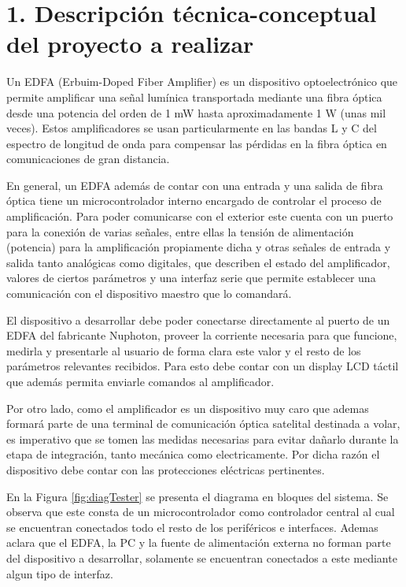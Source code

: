 \documentclass[
11pt, %
codirector, %
]{charter}
\begin{document}
\section{1. Descripción técnica-conceptual del proyecto a realizar}
\label{sec:descripcion}

Un EDFA (Erbuim-Doped Fiber Amplifier) es un dispositivo optoelectrónico que permite amplificar una señal lumínica transportada mediante una fibra óptica desde una potencia del orden de 1 mW hasta aproximadamente 1 W (unas mil veces). Estos amplificadores se usan particularmente en las bandas L y C del espectro de longitud de onda para compensar las pérdidas en la fibra óptica en comunicaciones de gran distancia.

En general, un EDFA además de contar con una entrada y una salida de fibra óptica tiene un microcontrolador interno encargado de controlar el proceso de amplificación. Para poder comunicarse con el exterior este cuenta con un puerto para la conexión de varias señales, entre ellas la tensión de alimentación (potencia) para la amplificación propiamente dicha y otras señales de entrada y salida tanto analógicas como digitales, que describen el estado del amplificador, valores de ciertos parámetros y una interfaz serie que permite establecer una comunicación con el dispositivo maestro que lo comandará.

El dispositivo a desarrollar debe poder conectarse directamente al puerto de un EDFA del fabricante Nuphoton, proveer la corriente necesaria para que funcione, medirla y presentarle al usuario de forma clara este valor y el resto de los parámetros relevantes recibidos. Para esto debe contar con un display LCD táctil que además permita enviarle comandos al amplificador.

Por otro lado, como el amplificador es un dispositivo muy caro que ademas formará parte de una terminal de comunicación óptica satelital destinada a volar, es imperativo que se tomen las medidas necesarias para evitar dañarlo durante la etapa de integración, tanto mecánica como electricamente. Por dicha razón el dispositivo debe contar con las protecciones eléctricas pertinentes.

En la Figura \ref{fig:diagTester} se presenta el diagrama en bloques del sistema. Se observa que este consta de un microcontrolador como controlador central al cual se encuentran conectados todo el resto de los periféricos e interfaces. Ademas aclara que el EDFA, la PC y la fuente de alimentación externa no forman parte del dispositivo a desarrollar, solamente se encuentran conectados a este mediante algun tipo de interfaz.
\end{document}
